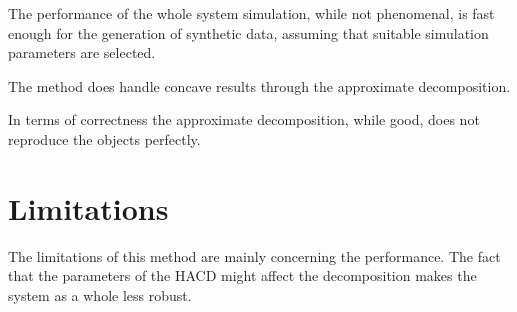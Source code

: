 The performance of the whole system simulation, while not phenomenal, is fast enough
for the generation of synthetic data, assuming that suitable simulation parameters
are selected.

The method does handle concave results through the approximate decomposition.

In terms of correctness the approximate decomposition, while good, does not reproduce the objects
perfectly.


\section{Limitations}
The limitations of this method are mainly concerning the performance. The fact
that the parameters of the HACD might affect the decomposition makes the system
as a whole less robust.
